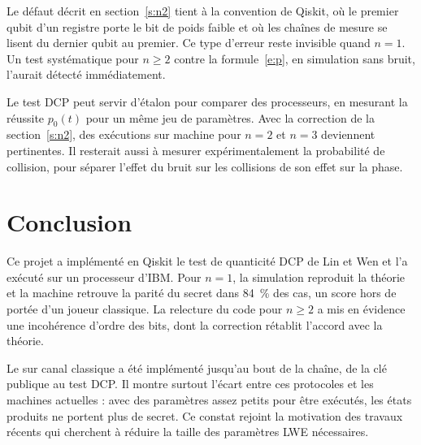  Le défaut décrit en section~\ref{s:n2} tient à la convention  de Qiskit, où
le premier qubit d'un registre porte le bit de poids faible
et où les chaînes de mesure se lisent du dernier qubit au
premier. Ce type d'erreur reste invisible quand $n = 1$. Un
test systématique pour $n \geq 2$ contre la formule~\eqref{e:p}, en
simulation sans bruit, l'aurait détecté immédiatement.

 Le test DCP peut servir d'étalon pour
comparer des processeurs, en mesurant la réussite $p_0(t)$
pour un même jeu de paramètres. Avec la correction
de la section~\ref{s:n2}, des exécutions sur machine pour $n = 2$
et $n = 3$ deviennent pertinentes. Il resterait aussi à
mesurer expérimentalement la probabilité de collision,
pour séparer l'effet du bruit sur les collisions de son effet sur la phase.

\section{Conclusion}
Ce projet a implémenté en Qiskit le test de quanticité
DCP de Lin et Wen et l'a exécuté sur un processeur
d'IBM. Pour $n = 1$, la simulation reproduit la théorie
et la machine retrouve la parité du secret dans 84~\% des
cas, un score hors de portée d'un joueur classique. La
relecture du code pour $n \geq 2$ a mis en évidence une
incohérence d'ordre des bits, dont la correction rétablit l'accord avec la théorie.

Le  sur canal classique a été implémenté jusqu'au bout de la chaîne, de la clé publique au test
DCP. Il montre surtout l'écart entre ces protocoles et
les machines actuelles : avec des paramètres assez petits
pour être exécutés, les états produits ne portent plus
de secret. Ce constat rejoint la motivation des travaux
récents qui cherchent à réduire la taille des paramètres LWE nécessaires.

